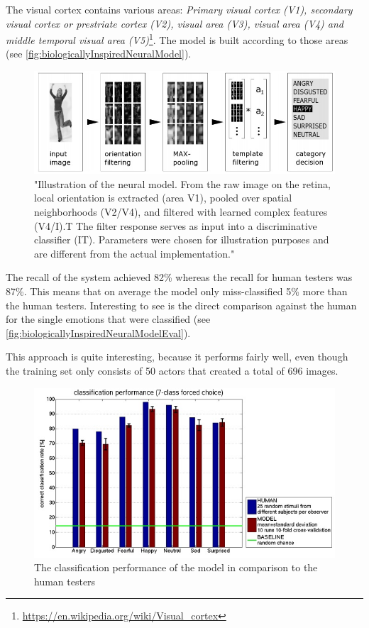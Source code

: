 \documentclass[conference]{IEEEtran}
\begin{document}
The visual cortex contains various areas: \emph{Primary visual cortex (V1), secondary visual cortex or prestriate cortex (V2), visual area (V3), visual area (V4) and middle temporal visual area (V5)}\footnote{\url{https://en.wikipedia.org/wiki/Visual_cortex}}. The model is built according to those areas (see \autoref{fig:biologicallyInspiredNeuralModel}). 
\begin{figure}[H]
\centering
\includegraphics[width=\linewidth]{biologicallyInspiredNeuralModel.jpg}
\caption{"Illustration of the neural model. From the raw image on the retina, local orientation is extracted (area V1), pooled over spatial neighborhoods (V2/V4), and filtered with learned complex features (V4/I).T The filter response serves as input
into a discriminative classifier (IT). Parameters were chosen for illustration purposes and are different from the actual implementation."\cite{schindler2008recognizing}}
\label{fig:biologicallyInspiredNeuralModel}
\end{figure}

The recall of the system achieved 82\% whereas the recall for human testers was 87\%. This means that on average the model only miss-classified 5\% more than the human testers. Interesting to see is the direct comparison against the human for the single emotions that were classified (see \autoref{fig:biologicallyInspiredNeuralModelEval}).

This approach is quite interesting, because it performs fairly well, even though the training set only consists of 50 actors that created a total of 696 images.

\begin{figure}[H]
\centering
\includegraphics[width=\linewidth]{biologicallyInspiredNeuralModelEval.jpg}
\caption{The classification performance of the model in comparison to the human testers\cite{schindler2008recognizing}}
\label{fig:biologicallyInspiredNeuralModelEval}
\end{figure}
\end{document}
